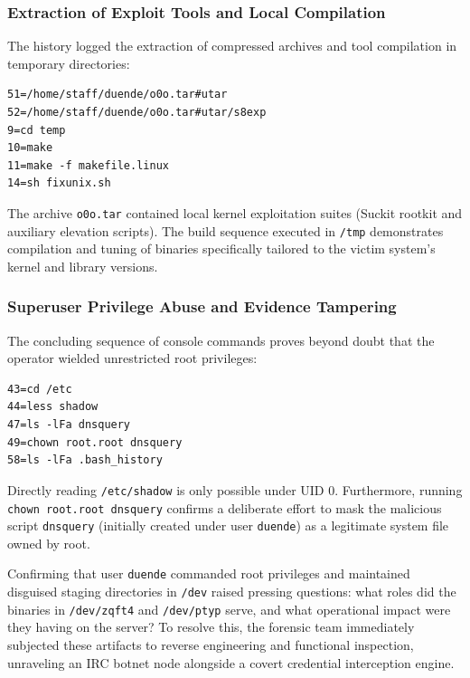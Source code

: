 \subsubsection{Extraction of Exploit Tools and Local Compilation}

The history logged the extraction of compressed archives and tool compilation in temporary directories:
\begin{lstlisting}[style=terminal]
51=/home/staff/duende/o0o.tar#utar
52=/home/staff/duende/o0o.tar#utar/s8exp
9=cd temp
10=make
11=make -f makefile.linux
14=sh fixunix.sh
\end{lstlisting}
The archive \texttt{o0o.tar} contained local kernel exploitation suites (Suckit rootkit and auxiliary elevation scripts). The build sequence executed in \texttt{/tmp} demonstrates compilation and tuning of binaries specifically tailored to the victim system's kernel and library versions.

\subsubsection{Superuser Privilege Abuse and Evidence Tampering}

The concluding sequence of console commands proves beyond doubt that the operator wielded unrestricted root privileges:
\begin{lstlisting}[style=terminal]
43=cd /etc
44=less shadow
47=ls -lFa dnsquery
49=chown root.root dnsquery
58=ls -lFa .bash_history
\end{lstlisting}
Directly reading \texttt{/etc/shadow} is only possible under UID 0. Furthermore, running \texttt{chown root.root dnsquery} confirms a deliberate effort to mask the malicious script \texttt{dnsquery} (initially created under user \texttt{duende}) as a legitimate system file owned by root.

Confirming that user \texttt{duende} commanded root privileges and maintained disguised staging directories in \texttt{/dev} raised pressing questions: what roles did the binaries in \texttt{/dev/zqft4} and \texttt{/dev/ptyp} serve, and what operational impact were they having on the server? To resolve this, the forensic team immediately subjected these artifacts to reverse engineering and functional inspection, unraveling an IRC botnet node alongside a covert credential interception engine.
